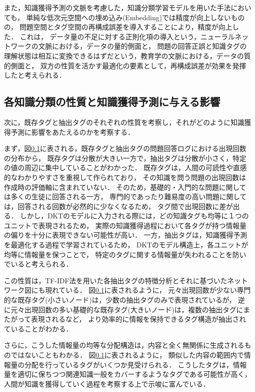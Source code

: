 また，知識獲得予測の文脈を考慮した，知識分類学習モデルを用いた手法においても，
単純な低次元空間への埋め込み(Embedding)では精度が向上しないものの，
問題空間とタグ空間の再構成誤差を導入することにより，精度が向上した．
これは，
データ量の不足に対する正則化項の導入という，ニューラルネットワークの文脈における，データの量的側面と，
問題の回答正誤と知識タグの理解状態は相互に変換できるはずだという，教育学の文脈における，データの質的側面と，
双方の性質を活かす最適化の要素として，再構成誤差が効果を発揮したと考えられる．



\subsection{各知識分類の性質と知識獲得予測に与える影響}
次に，既存タグと抽出タグのそれぞれの性質を考察し，それがどのように知識獲得予測に影響をあたえるのかを考察する．

まず，図\ref{}に表される，既存タグと抽出タグの問題回答ログにおける出現回数の分布から，
既存タグは分散が大きい一方で，抽出タグは分散が小さく，特定の値の周辺に集中していることがわかった．
既存タグは，人間の可読性や直感的なわかりやすさを重視して作られており，
その知識を問う問題の出現回数は作成時の評価軸に含まれていない．
そのため，基礎的・入門的な問題に関しては多くの生徒に回答される一方，
専門的であったり難易度の高い問題に関しては，回答される回数が必然的に少なくなるため，
タグ間で出現回数に差が出る．
しかし，DKTのモデルに入力される際には，どの知識タグも均等に１つのユニットで表現されるため，
実際の知識獲得過程において各タグが持つ情報量の偏りを十分に表現できない可能性が高い．
一方，抽出タグは，知識獲得予測を最適化する過程で学習されているため，
DKTのモデル構造上，各ユニットが均等に情報量を保つことで，
特定のタグに関する情報量が失われることを防いでいると考えられる．

この性質は，TF-IDF法を用いた各抽出タグの特徴分析とそれに基づいたネットワーク図にも現れている．
図\ref{}に表されるように，
元々出現回数が少ない専門的な既存タグ(小さいノード)は，少数の抽出タグのみで表現されているが，
逆に元々出現回数の多い基礎的な既存タグ(大きいノード)は，複数の抽出タグにまたがって表現されるなど，
より効率的に情報を保持できるタグ構造が抽出されていることがわかる．

さらに，こうした情報量の均等な分配構造は，内容と全く無関係に生成されるものではないこともわかる．
図\ref{}に表されるように，
類似した内容の範囲内で情報量の分配を行っているタグがいくつか見受けられる．
こうしたタグは，情報量を適切に保ちつつ関連知識一般をカバーするようなタグである可能性が高く，
人間が知識を獲得していく過程を考察する上で示唆に富んでいる．




